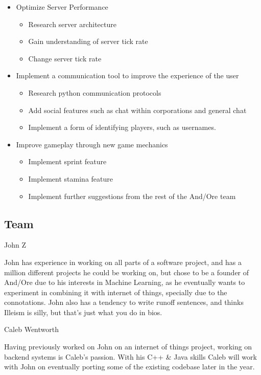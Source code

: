 \documentclass[11pt]{article}
\begin{document}
\begin{itemize}
	\item Optimize Server Performance
		\begin{itemize}
			\item Research server architecture
			\item Gain understanding of server tick rate
			\item Change server tick rate
		\end{itemize}
	\item Implement a communication tool to improve the experience of the user
		\begin{itemize}
			\item Research python communication protocols
			\item Add social features such as chat within corporations and general chat
			\item Implement a form of identifying players, such as usernames.
		\end{itemize}
	\item Improve gameplay through new game mechanics
		\begin{itemize}
			\item Implement sprint feature
			\item Implement stamina feature
			\item Implement further suggestions from the rest of the And/Ore team
		\end{itemize}
\end{itemize}

\subsection{{\color{blue}Team}}

{\large {\color{orange}John Z}}

John has experience in working on all parts of a software project, and has a million different projects he could be working on, but chose to be a founder of And/Ore due to his interests in Machine Learning, as he eventually wants to experiment in combining it with internet of things, specially due to the connotations. John also has a tendency to write runoff sentences, and thinks Illeism is silly, but that's just what you do in bios.

{\large {\color{orange}Caleb Wentworth}}

Having previously worked on John on an internet of things project, working on backend systems is Caleb's passion. With his C++ \& Java skills Caleb will work with John on eventually porting some of the existing codebase later in the year.
\end{document}
